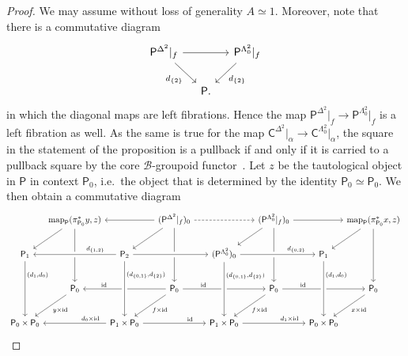 \documentclass[reqno]{amsart}
\numberwithin{equation}{subsection}
\theoremstyle{plain}
\theoremstyle{definition}
\let\scr=\mathcal
\def\BB{\scr B}
\DeclareMathOperator{\id}{id}
\DeclareMathOperator{\Map}{map}
\newcommand{\map}[1]{\Map_{#1}}
\newcommand{\I}[1]{\mathsf{#1}}
\begin{document}
\begin{proof}
	We may assume without loss of generality $A\simeq 1$. Moreover, note that there is a commutative diagram
	\begin{equation*}
	\begin{tikzcd}[column sep=small]
	\I{P}^{\Delta^2}\vert_f\arrow[rr]\arrow[dr, "d_{\{2\}}"'] && \I{P}^{\Lambda^2_0}\vert_f\arrow[dl, "d_{\{2\}}"]\\
	& \I{P}. &
	\end{tikzcd}
	\end{equation*}
	in which the diagonal maps are left fibrations. Hence the map $\I{P}^{\Delta^2}\vert_f\to\I{P}^{\Lambda^2_0}\vert_f$ is a left fibration as well. As the same is true for the map $\I{C}^{\Delta^2}\vert_\alpha\to\I{C}^{\Lambda^2_0}\vert_\alpha$, the square in the statement of the proposition is a pullback if and only if it is carried to a pullback square by the core $\BB$-groupoid functor~\cite[Proposition~4.1.18]{Martini2021}. Let $z$ be the tautological object in $\I{P}$ in context $\I{P}_0$, i.e.\ the object that is determined by the identity $\I{P}_0\simeq\I{P}_0$. We then obtain a commutative diagram
	\begin{equation*}
		\begin{tikzcd}[column sep={5.8em,between origins}, row sep={4em,between origins}]
		& \map{\I{P}}(\pi_{\I{P}_0}^\ast y,z)\arrow[from=rr] \arrow[dl]\arrow[dd]&& (\I{P}^{\Delta^2}\vert_f)_0\arrow[rr, dashed] \arrow[dd]\arrow[dl]&& (\I{P}^{\Lambda^2_0}\vert_f)_0\arrow[rr]\arrow[dl]\arrow[dd]&& \map{\I{P}}(\pi_{\I{P}_0}^\ast x,z)\arrow[dl]\arrow[dd]\\
		\I{P}_1\arrow[from=rr, "d_{\{1,2\}}"', crossing over, near start]\arrow[dd, "{(d_1,d_0)}", near start] && \I{P}_2 \arrow[rr, crossing over]&& (\I{P}^{\Lambda^2_0})_0\arrow[rr, "d_{\{0,2\}}", crossing over, near end] && \I{P}_1 & \\
		& \I{P}_0 \arrow[dl, "y\times\id"]\arrow[from=rr, "\id"', near end]&&\I{P}_0 \arrow[dl, "f\times\id"]\arrow[rr, "\id", near start]&& \I{P}_0\arrow[rr, "\id", near start]\arrow[dl, "f\times\id"]&&\I{P}_0\arrow[dl, "x\times\id"]\\
		\I{P}_0\times\I{P}_0\arrow[from=rr, "d_0\times\id"', near start] && \I{P}_1\times\I{P}_0\arrow[rr, "\id", near end]\arrow[from=uu, "{(d_{\{0,1\}}, d_{\{2\}})}", crossing over, near start]&& \I{P}_1\times\I{P}_0\arrow[rr, "d_1\times\id", near end]\arrow[from=uu, "{(d_{\{0,1\}}, d_{\{2\}})}", crossing over, near start] && \I{P}_0\times\I{P}_0 \arrow[from=uu, "{(d_1,d_0)}", crossing over, near start]&

\end{tikzcd}
\end{equation*}
\end{proof}
\end{document}
